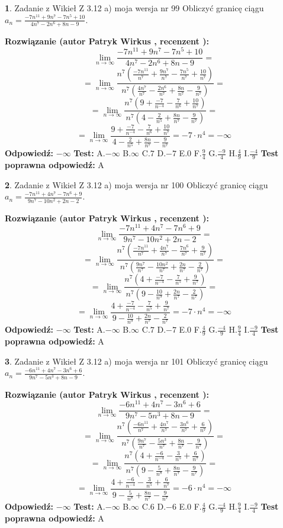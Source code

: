 \documentclass[12pt, a4paper]{article}
\theoremstyle{definition} %
\newtheorem{zad}{}
\newcommand{\zadStart}[1]{\begin{zad}#1\newline}
\newcommand{\zadStop}{\end{zad}}
\newcommand{\rozwStart}[2]{\noindent \textbf{Rozwiązanie (autor #1 , recenzent #2): }\newline}
\newcommand{\rozwStop}{\newline}
\newcommand{\odpStart}{\noindent \textbf{Odpowiedź:}\newline}
\newcommand{\odpStop}{\newline}
\newcommand{\testStart}{\noindent \textbf{Test:}\newline}
\newcommand{\testStop}{\newline}
\newcommand{\kluczStart}{\noindent \textbf{Test poprawna odpowiedź:}\newline}
\newcommand{\kluczStop}{\newline}
\begin{document}
\zadStart{Zadanie z Wikieł Z 3.12 a) moja wersja nr 99}
Obliczyć granicę ciągu $a_{n}=\frac{-7n^{11}+9n^{7}-7n^{5}+10}{4n^{7}-2n^{6}+8n-9}$.
\zadStop
\rozwStart{Patryk Wirkus}{}
$$\lim\limits_{n\to\infty}\frac{-7n^{11}+9n^{7}-7n^{5}+10}{4n^{7}-2n^{6}+8n-9}=$$
$$=\lim\limits_{n\to\infty}\frac{n^{7}\left(\frac{-7n^{11}}{n^{7}}+\frac{9n^{7}}{n^{7}}-\frac{7n^{5}}{n^{7}}+\frac{10}{n^{7}}\right)}{n^{7}\left(\frac{4n^{7}}{n^{7}}-\frac{2n^{6}}{n^{7}}+\frac{8n}{n^{7}}-\frac{9}{n^{7}}\right)}=$$
$$=\lim\limits_{n\to\infty}\frac{n^{7}\left(9+\frac{-7}{n^{-4}}-\frac{7}{n^{6}}+\frac{10}{n^{7}}\right)}
{n^{7}\left(4-\frac{2}{n^{5}}+\frac{8n}{n^{7}}-\frac{9}{n^{7}}\right)}=$$
$$=\lim\limits_{n\to\infty}\frac{9+\frac{-7}{n^{-4}}-\frac{7}{n^{6}}+\frac{10}{n^{7}}}{4-\frac{2}{n^{5}}+\frac{8n}{n^{7}}-\frac{9}{n^{7}}}=-7\cdot n^{4} = -\infty$$
\rozwStop
\odpStart
$-\infty$
\odpStop
\testStart
A.$-\infty$
B.$\infty$
C.$7$
D.$-7$
E.$0$
F.$\frac{9}{4}$
G.$\frac{-9}{4}$
H.$\frac{4}{9}$
I.$\frac{-4}{9}$
\testStop
\kluczStart
A
\kluczStop



\zadStart{Zadanie z Wikieł Z 3.12 a) moja wersja nr 100}
Obliczyć granicę ciągu $a_{n}=\frac{-7n^{11}+4n^{7}-7n^{6}+9}{9n^{7}-10n^{2}+2n-2}$.
\zadStop
\rozwStart{Patryk Wirkus}{}
$$\lim\limits_{n\to\infty}\frac{-7n^{11}+4n^{7}-7n^{6}+9}{9n^{7}-10n^{2}+2n-2}=$$
$$=\lim\limits_{n\to\infty}\frac{n^{7}\left(\frac{-7n^{11}}{n^{7}}+\frac{4n^{7}}{n^{7}}-\frac{7n^{6}}{n^{7}}+\frac{9}{n^{7}}\right)}{n^{7}\left(\frac{9n^{7}}{n^{7}}-\frac{10n^{2}}{n^{7}}+\frac{2n}{n^{7}}-\frac{2}{n^{7}}\right)}=$$
$$=\lim\limits_{n\to\infty}\frac{n^{7}\left(4+\frac{-7}{n^{-4}}-\frac{7}{n^{5}}+\frac{9}{n^{7}}\right)}
{n^{7}\left(9-\frac{10}{n^{9}}+\frac{2n}{n^{7}}-\frac{2}{n^{7}}\right)}=$$
$$=\lim\limits_{n\to\infty}\frac{4+\frac{-7}{n^{-4}}-\frac{7}{n^{5}}+\frac{9}{n^{7}}}{9-\frac{10}{n^{9}}+\frac{2n}{n^{7}}-\frac{2}{n^{7}}}=-7\cdot n^{4} = -\infty$$
\rozwStop
\odpStart
$-\infty$
\odpStop
\testStart
A.$-\infty$
B.$\infty$
C.$7$
D.$-7$
E.$0$
F.$\frac{4}{9}$
G.$\frac{-4}{9}$
H.$\frac{9}{4}$
I.$\frac{-9}{4}$
\testStop
\kluczStart
A
\kluczStop



\zadStart{Zadanie z Wikieł Z 3.12 a) moja wersja nr 101}
Obliczyć granicę ciągu $a_{n}=\frac{-6n^{11}+4n^{7}-3n^{6}+6}{9n^{7}-5n^{3}+8n-9}$.
\zadStop
\rozwStart{Patryk Wirkus}{}
$$\lim\limits_{n\to\infty}\frac{-6n^{11}+4n^{7}-3n^{6}+6}{9n^{7}-5n^{3}+8n-9}=$$
$$=\lim\limits_{n\to\infty}\frac{n^{7}\left(\frac{-6n^{11}}{n^{7}}+\frac{4n^{7}}{n^{7}}-\frac{3n^{6}}{n^{7}}+\frac{6}{n^{7}}\right)}{n^{7}\left(\frac{9n^{7}}{n^{7}}-\frac{5n^{3}}{n^{7}}+\frac{8n}{n^{7}}-\frac{9}{n^{7}}\right)}=$$
$$=\lim\limits_{n\to\infty}\frac{n^{7}\left(4+\frac{-6}{n^{-4}}-\frac{3}{n^{5}}+\frac{6}{n^{7}}\right)}
{n^{7}\left(9-\frac{5}{n^{8}}+\frac{8n}{n^{7}}-\frac{9}{n^{7}}\right)}=$$
$$=\lim\limits_{n\to\infty}\frac{4+\frac{-6}{n^{-4}}-\frac{3}{n^{5}}+\frac{6}{n^{7}}}{9-\frac{5}{n^{8}}+\frac{8n}{n^{7}}-\frac{9}{n^{7}}}=-6\cdot n^{4} = -\infty$$
\rozwStop
\odpStart
$-\infty$
\odpStop
\testStart
A.$-\infty$
B.$\infty$
C.$6$
D.$-6$
E.$0$
F.$\frac{4}{9}$
G.$\frac{-4}{9}$
H.$\frac{9}{4}$
I.$\frac{-9}{4}$
\testStop
\kluczStart
A
\kluczStop
\end{document}
